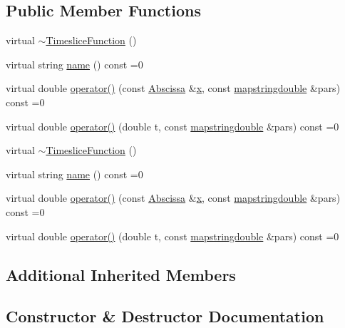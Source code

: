 \subsection*{Public Member Functions}
\begin{DoxyCompactItemize}
\item 
virtual \mbox{\hyperlink{classTimesliceFunction_a5a3af2bca0b018658f57914bef2fe371}{$\sim$\+Timeslice\+Function}} ()
\item 
virtual string \mbox{\hyperlink{classTimesliceFunction_addfcdb96287c354039a1536879cfe787}{name}} () const =0
\item 
virtual double \mbox{\hyperlink{classTimesliceFunction_ac4426035b36872933c70b5e0ad8cb4e3}{operator()}} (const \mbox{\hyperlink{classAbscissa}{Abscissa}} \&\mbox{\hyperlink{old__edb_8cc_a63584b830e7aaacb521b11b72291a4bc}{x}}, const \mbox{\hyperlink{lib_2fitting__lib_2includes_8h_a647b481c557c7966517f753340a81d13}{mapstringdouble}} \&pars) const =0
\item 
virtual double \mbox{\hyperlink{classTimesliceFunction_a0a71b38a0008247e9ed3726b466132c3}{operator()}} (double t, const \mbox{\hyperlink{lib_2fitting__lib_2includes_8h_a647b481c557c7966517f753340a81d13}{mapstringdouble}} \&pars) const =0
\item 
virtual \mbox{\hyperlink{classTimesliceFunction_a5a3af2bca0b018658f57914bef2fe371}{$\sim$\+Timeslice\+Function}} ()
\item 
virtual string \mbox{\hyperlink{classTimesliceFunction_addfcdb96287c354039a1536879cfe787}{name}} () const =0
\item 
virtual double \mbox{\hyperlink{classTimesliceFunction_ac4426035b36872933c70b5e0ad8cb4e3}{operator()}} (const \mbox{\hyperlink{classAbscissa}{Abscissa}} \&\mbox{\hyperlink{old__edb_8cc_a63584b830e7aaacb521b11b72291a4bc}{x}}, const \mbox{\hyperlink{lib_2fitting__lib_2includes_8h_a647b481c557c7966517f753340a81d13}{mapstringdouble}} \&pars) const =0
\item 
virtual double \mbox{\hyperlink{classTimesliceFunction_a0a71b38a0008247e9ed3726b466132c3}{operator()}} (double t, const \mbox{\hyperlink{lib_2fitting__lib_2includes_8h_a647b481c557c7966517f753340a81d13}{mapstringdouble}} \&pars) const =0
\end{DoxyCompactItemize}
\subsection*{Additional Inherited Members}


\subsection{Constructor \& Destructor Documentation}
\mbox{\label{classTimesliceFunction_a5a3af2bca0b018658f57914bef2fe371}} 
